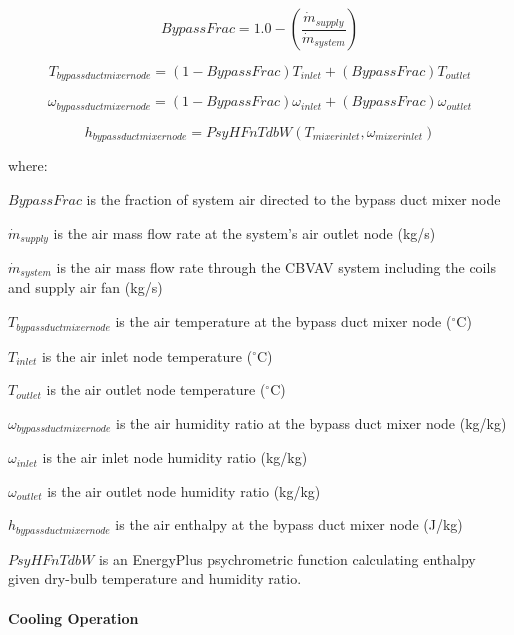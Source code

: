 \begin{equation}
BypassFrac = 1.0 - \left( {\frac{{{{\dot m}_{supply}}}}{{{{\dot m}_{system}}}}} \right)
\end{equation}

\begin{equation}
{T_{bypassductmixernode}} = \left( {1 - BypassFrac} \right){T_{inlet}} + \left( {BypassFrac} \right){T_{outlet}}
\end{equation}

\begin{equation}
{\omega_{bypassductmixernode}} = \left( {1 - BypassFrac} \right){\omega_{inlet}} + \left( {BypassFrac} \right){\omega_{outlet}}
\end{equation}

\begin{equation}
{h_{bypassductmixernode}} = PsyHFnTdbW\left( {{T_{mixerinlet}},{\omega_{mixerinlet}}} \right)
\end{equation}

where:

\(BypassFrac\) is the fraction of system air directed to the bypass duct mixer node

\({\dot m_{supply}}\) is the air mass flow rate at the system's air outlet node (kg/s)

\({\dot m_{system}}\) is the air mass flow rate through the CBVAV system including the coils and supply air fan (kg/s)

\({T_{bypassductmixernode}}\) is the air temperature at the bypass duct mixer node (\(^{\circ}\)C)

\({T_{inlet}}\) is the air inlet node temperature (\(^{\circ}\)C)

\({T_{outlet}}\) is the air outlet node temperature (\(^{\circ}\)C)

\({\omega_{bypassductmixernode}}\) is the air humidity ratio at the bypass duct mixer node (kg/kg)

\({\omega_{inlet}}\) is the air inlet node humidity ratio (kg/kg)

\({\omega_{outlet}}\) is the air outlet node humidity ratio (kg/kg)

\({h_{bypassductmixernode}}\) is the air enthalpy at the bypass duct mixer node (J/kg)

\(PsyHFnTdbW\) is an EnergyPlus psychrometric function calculating enthalpy given dry-bulb temperature and humidity ratio.

\paragraph{Cooling Operation}\label{cooling-operation}

